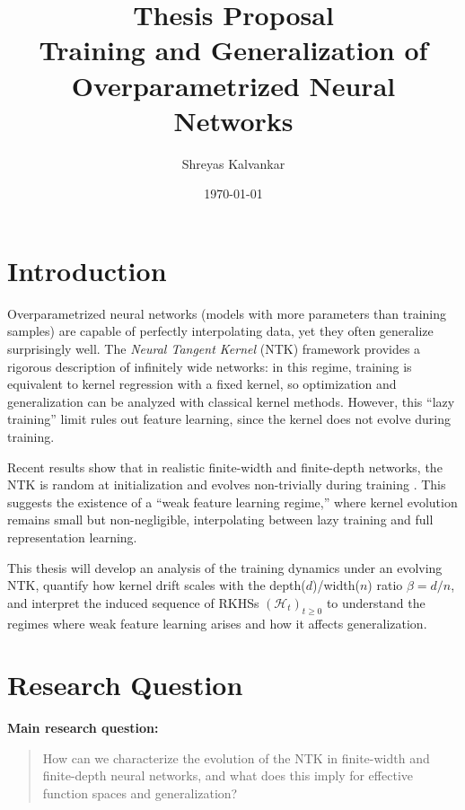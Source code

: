 \documentclass[11pt,a4paper]{article}
\title{Thesis Proposal \\[0.5em]
Training and Generalization of Overparametrized Neural Networks}
\author{Shreyas Kalvankar}
\date{\today}
\begin{document}
\maketitle

\section{Introduction}
Overparametrized neural networks (models with more parameters than training
samples) are capable of perfectly interpolating data, yet they often generalize
surprisingly well. The \emph{Neural Tangent Kernel} (NTK) framework
\citep{jacot2018ntk,lee2020wide} provides a rigorous description of infinitely
wide networks: in this regime, training is equivalent to kernel regression with
a fixed kernel, so optimization and generalization can be analyzed with
classical kernel methods. However, this ``lazy training'' limit rules out
feature learning, since the kernel does not evolve during training.

Recent results show that in realistic finite-width and finite-depth networks,
the NTK is random at initialization and evolves non-trivially during training
\citep{haninNica2019finite}. This suggests the existence of a ``weak feature
learning regime,'' where kernel evolution remains small but non-negligible,
interpolating between lazy training and full representation learning.

This thesis will develop an analysis of the training dynamics under an evolving
NTK, quantify how kernel drift scales with the depth($d$)/width($n$) ratio $\beta=d/n$,
and interpret the induced sequence of RKHSs $(\mathcal H_t)_{t\geq0}$ to
understand the regimes where weak feature learning arises and how it affects
generalization.

\section{Research Question}
\textbf{Main research question:}
\begin{quote}
	How can we characterize the evolution of the NTK in finite-width and finite-depth neural networks, and what does this imply for effective function spaces and generalization?
\end{quote}
\end{document}
